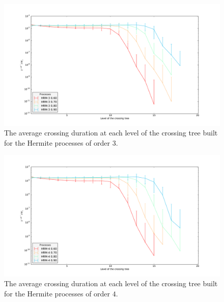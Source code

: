 \documentclass[a4paper]{article}
\begin{document}
\begin{figure}[htb]\begin{center}
    \includegraphics[width=6in]{images/fig_08_med_HRM-3_10000-17}
    \caption{The average crossing duration at each level of the crossing tree built
    for the Hermite processes of order $3$.}
\label{fig:hrm_3_durations}
\end{center}\end{figure}

\begin{figure}[htb]\begin{center}
    \includegraphics[width=6in]{images/fig_08_med_HRM-4_10000-17}
    \caption{The average crossing duration at each level of the crossing tree built
    for the Hermite processes of order $4$.}
\label{fig:hrm_4_durations}
\end{center}\end{figure}
\end{document}
